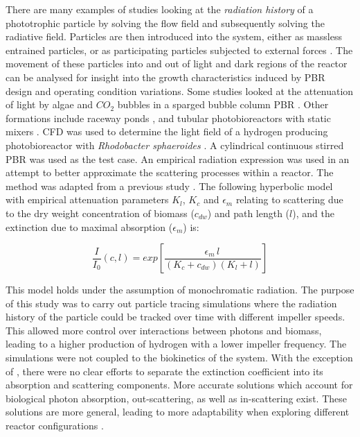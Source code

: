 There are many examples of studies looking at the \textit{radiation history} of a phototrophic particle by solving the flow field and subsequently solving the radiative field. Particles are then introduced into the system, either as massless entrained particles, or as participating particles subjected to external forces \cite{Zhang2013}. The movement of these particles into and out of light and dark regions of the reactor can be analysed for insight into the growth characteristics induced by PBR design and operating condition variations. Some studies looked at the attenuation of light by algae and $CO_2$ bubbles in a sparged bubble column PBR \cite{Hochhalter2014}. Other formations include raceway ponds \cite{Gharagozloo2014a,Park2015}, and tubular photobioreactors with static mixers \cite{Cheng2016}. CFD was used to determine the light field of a hydrogen producing photobioreactor with \textit{Rhodobacter sphaeroides} \cite{Krujatz2015}. A cylindrical continuous stirred PBR was used as the test case. An empirical radiation expression was used in an attempt to better approximate the scattering processes within a reactor. The method was adapted from a previous study \cite{Suh2003}. The following hyperbolic model with empirical attenuation parameters $K_l$, $K_c$ and $\epsilon_m$ relating to scattering due to the dry weight concentration of biomass ($c_{dw}$) and path length ($l$), and the extinction due to maximal absorption ($\epsilon_m$) is:


\begin{equation} 
\frac{I}{I_0} (c,l) = exp \left[\frac{\epsilon_m \, l \, }{(K_c + c_{dw})(K_l + l)}\right]
\end{equation}

This model holds under the assumption of monochromatic radiation. The purpose of this study was to carry out particle tracing simulations where the radiation history of the particle could be tracked over time with different impeller speeds. This allowed more control over interactions between photons and biomass, leading to a higher production of hydrogen with a lower impeller frequency. The simulations were not coupled to the biokinetics of the system. With the exception of \cite{Gharagozloo2014a,Krujatz2015}, there were no clear efforts to separate the extinction coefficient into its absorption and scattering components. More accurate solutions which account for biological photon absorption, out-scattering, as well as in-scattering exist. These solutions are more general, leading to more adaptability when exploring different reactor configurations \cite{Ho2009}.


